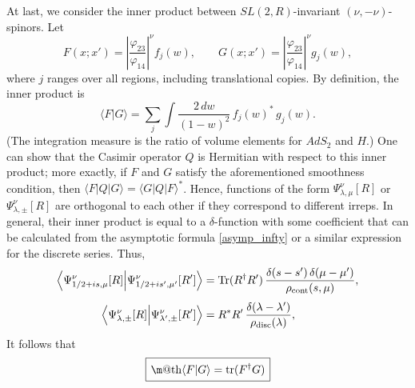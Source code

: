 \documentclass[12pt]{article}
\makeatletter
\newcommand*{\wideboxed}[1]{\setlength{\fboxsep}{1ex}%
  \fbox{\m@th$\displaystyle#1$}}
\newcommand*{\bra}[1]{\langle{#1}|}
\newcommand*{\ket}[1]{|{#1}\rangle}
\newcommand*{\braket}[2]{\langle{#1}|{#2}\rangle}
\newcommand{\vp}{\varphi}
\newcommand{\RR}{\mathbb{R}}
\DeclareMathOperator{\tr}{tr}
\DeclareMathOperator{\Tr}{Tr}
\DeclareMathOperator{\SL}{SL}
\DeclareMathOperator{\AdS}{AdS}
\newcommand{\rcont}{\rho_{\text{cont}}}
\newcommand{\rdisc}{\rho_{\text{disc}}}
\def\widetilde#1{#1}%
\def\AdS{AdS}
\def\SL{SL}
\def\RR{R}
\makeatother
\begin{document}
At last, we consider the inner product between $\widetilde{\SL}(2,\RR)$-invariant $(\nu,-\nu)$-spinors. Let
\begin{equation}
F(x;x')=\left|\frac{\vp_{23}}{\vp_{14}}\right|^{\nu}f_j(w),\qquad
G(x;x')=\left|\frac{\vp_{23}}{\vp_{14}}\right|^{\nu}g_j(w),
\end{equation}
where $j$ ranges over all regions, including translational copies. By definition, the inner product is
\begin{equation}
\braket{F}{G}=\sum_{j}\int \frac{2\,dw}{(1-w)^2}\,f_j(w)^{*}\,g_j(w).
\end{equation}
(The integration measure is the ratio of volume elements for $\widetilde{\AdS}_2$ and $H$.) One can show that the Casimir operator $Q$ is Hermitian with respect to this inner product; more exactly, if $F$ and $G$ satisfy the aforementioned smoothness condition, then $\bra{F}Q\ket{G}=\bra{G}Q\ket{F}^{*}$. Hence, functions of the form $\Psi^{\nu}_{\lambda,\mu}[R]$ or $\Psi^{\nu}_{\lambda,\pm}[R]$ are orthogonal to each other if they correspond to different irreps. In general, their inner product is equal to a $\delta$-function with some coefficient that can be calculated from the asymptotic formula \eqref{asymp_infty} or a similar expression for the discrete series. Thus,
\begin{equation}
\begin{aligned}
\Bigl\langle\Psi^{\nu}_{1/2+is,\mu}[R] \Big|
\Psi^{\nu}_{1/2+is',\mu'}[R']\Bigr\rangle
&=\Tr(R^{\dag}R')\,\frac{\delta(s-s')\,\delta(\mu-\mu')}{\rcont(s,\mu)},
\\[3pt]
\Bigl\langle\Psi^{\nu}_{\lambda,\pm}[R] \Big|
\Psi^{\nu}_{\lambda',\pm}[R']\Bigr\rangle
&=R^*R'\,\frac{\delta(\lambda-\lambda')}{\rdisc(\lambda)},
\end{aligned}
\end{equation}
It follows that
\begin{equation}
\wideboxed{
\braket{F}{G}=\tr(F^{\dag}G)
}
\end{equation}




 
\end{document}
